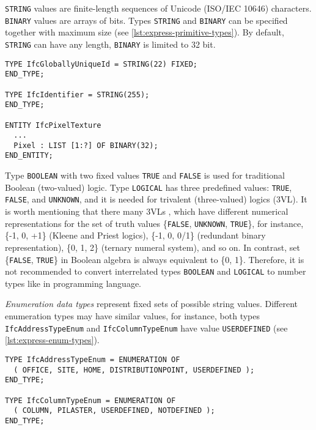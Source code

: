 \texttt{STRING} values are finite-length sequences of Unicode (ISO/IEC 10646) characters.
\texttt{BINARY} values are arrays of bits.
Types \texttt{STRING} and \texttt{BINARY} can be specified together with maximum size (see \autoref{lst:express-primitive-types}).
By default, \texttt{STRING} can have any length, \texttt{BINARY} is limited to 32 bit.

\begin{lstlisting}[caption={Examples of \texttt{STRING} and \texttt{BINARY} types with maximum size.},label=lst:express-primitive-types]
TYPE IfcGloballyUniqueId = STRING(22) FIXED;
END_TYPE;

TYPE IfcIdentifier = STRING(255);
END_TYPE;

ENTITY IfcPixelTexture
  ...
  Pixel : LIST [1:?] OF BINARY(32);
END_ENTITY;
\end{lstlisting}



Type \texttt{BOOL\-EAN} with two fixed values \texttt{TRUE} and \texttt{FALSE} is used for traditional Boolean (two-valued) logic.
Type \texttt{LOG\-I\-CAL} has three predefined values: \texttt{TRUE},  \texttt{FALSE}, and \texttt{UNKNOWN}, and it is needed for trivalent (three-valued) logics (3VL).
It is worth mentioning that there many 3VLs \cite{fronthofer2011manyvaluedlogics}, which have different numerical representations for the set of truth values \{\texttt{FALSE}, \texttt{UNKNOWN}, \texttt{TRUE}\}, for instance, \{-1, 0, +1\} (Kleene and Priest logics), \{-1, 0, 0/1\} (redundant binary representation), \{0, 1, 2\} (ternary numeral system), and so on.
In contrast, set \{\texttt{FALSE}, \texttt{TRUE}\} in Boolean algebra is always equivalent to \{0, 1\}.
Therefore, it is not recommended to convert interrelated types \texttt{BOOLEAN} and \texttt{LOGICAL} to number types like in \CPP{} programming language.


\emph{Enumeration data types} represent fixed sets of possible string values.
Different enumeration types may have similar values, for instance, both types \texttt{IfcAddressTypeEnum} and \texttt{IfcColumnTypeEnum} have value \texttt{USERDEFINED} (see \autoref{lst:express-enum-types}).


\begin{lstlisting}[caption={Printout of enumeration types \texttt{IfcAddressTypeEnum} and \texttt{IfcColumnTypeEnum}.},label=lst:express-enum-types]
TYPE IfcAddressTypeEnum = ENUMERATION OF
  ( OFFICE, SITE, HOME, DISTRIBUTIONPOINT, USERDEFINED );
END_TYPE;

TYPE IfcColumnTypeEnum = ENUMERATION OF
  ( COLUMN, PILASTER, USERDEFINED, NOTDEFINED );
END_TYPE;
\end{lstlisting}


